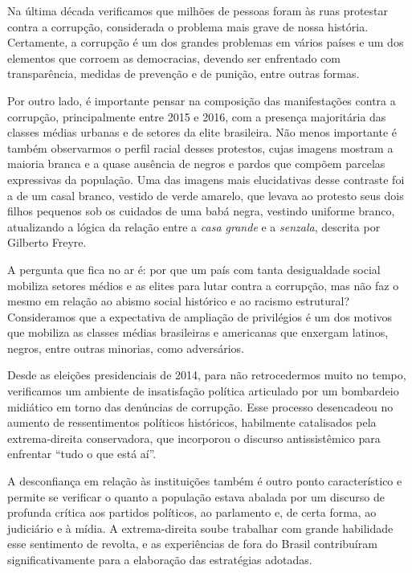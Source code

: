 Na última década verificamos que milhões de pessoas foram às ruas
protestar contra a corrupção, considerada o problema mais grave de nossa
história. Certamente, a corrupção é um dos grandes problemas em vários
países e um dos elementos que corroem as democracias, devendo ser
enfrentado com transparência, medidas de prevenção e de punição, entre
outras formas.

Por outro lado, é importante pensar na composição das manifestações
contra a corrupção, principalmente entre 2015 e 2016, com a presença
majoritária das classes médias urbanas e de setores da elite brasileira.
Não menos importante é também observarmos o perfil racial desses
protestos, cujas imagens mostram a maioria branca e a quase ausência de
negros e pardos que compõem parcelas expressivas da população. Uma das
imagens mais elucidativas desse contraste foi a de um casal branco,
vestido de verde amarelo, que levava ao protesto seus dois filhos
pequenos sob os cuidados de uma babá negra, vestindo uniforme branco,
atualizando a lógica da relação entre a \textit{casa grande} e a \textit{senzala},
descrita por Gilberto Freyre.

A pergunta que fica no ar é: por que um país com tanta desigualdade
social mobiliza setores médios e as elites para lutar contra a
corrupção, mas não faz o mesmo em relação ao abismo social histórico e
ao racismo estrutural? Consideramos que a expectativa de ampliação de
privilégios é um dos motivos que mobiliza as classes médias brasileiras
e americanas que enxergam latinos, negros, entre outras minorias, como
adversários.

Desde as eleições presidenciais de 2014, para não retrocedermos muito no
tempo, verificamos um ambiente de insatisfação política articulado por
um bombardeio midiático em torno das denúncias de corrupção. Esse
processo desencadeou no aumento de ressentimentos políticos históricos,
habilmente catalisados pela extrema-direita conservadora, que incorporou
o discurso antissistêmico para enfrentar ``tudo o que está aí''.

A desconfiança em relação às instituições também é outro ponto
característico e permite se verificar o quanto a população estava abalada por um
discurso de profunda crítica aos partidos políticos, ao parlamento e, de
certa forma, ao judiciário e à mídia. A extrema-direita soube trabalhar
com grande habilidade esse sentimento de revolta, e as experiências de
fora do Brasil contribuíram significativamente para a elaboração das
estratégias adotadas.

